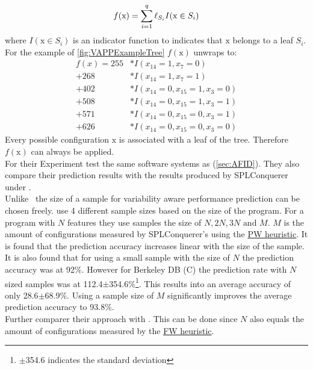 \begin{equation}\textsl{}
f(\mathrm{x})=\sum_{i=1}^{q} \ell_{S_i}I(\mathrm{x}\in S_i)
\end{equation}
where $I(\mathrm{x}\in S_i)$ is an indicator function to indicates that $\mathrm{x}$ belongs to a leaf $S_i$.\\
For the example of \autoref{fig:VAPPExampleTree} $f(\mathrm{x})$ unwraps to:
\begin{align*}
f(x) = 255&* I(x_{14}=1,x_7=0)\\[-0.1cm]
	 + 268&* I(x_{14}=1,x_7=1)\\[-0.1cm]
	 + 402&* I(x_{14}=0,x_{15}=1,x_3=0)\\[-0.1cm]
	 + 508&* I(x_{14}=0,x_{15}=1,x_3=1)\\[-0.1cm]
	 + 571&* I(x_{14}=0,x_{15}=0,x_3=1)\\[-0.1cm]
	 + 626&* I(x_{14}=0,x_{15}=0,x_3=0)
\end{align*}
Every possible configuration $\mathrm{x}$ is associated with a leaf of the tree. Therefore $f(\mathrm{x})$ can always be applied.\\
For their Experiment \citet{VariabilityAwarePerformancePredictionJianmeiSigmundApel} test the same software systems as \citet{AutomatedFeatureDetectionSiegmund2012} (\cref{sec:AFID}). They also compare their prediction results with the results produced by SPLConquerer under \AFID.\\
Unlike \AFID~the size of a sample for variability aware performance prediction can be chosen freely. \citet{VariabilityAwarePerformancePredictionJianmeiSigmundApel} use 4 different sample sizes based on the size of the program. For a program with $N$ features they use samples the size of $N,2N,3N \text{ and } M$. $M$ is the amount of configurations measured by SPLConquerer's using the \hyperref[lab:PW]{PW heuristic}.
It is found that the prediction accuracy increases linear with the size of the sample. It is also found that for using a small sample with the size of $N$ the prediction accuracy was at 92\%. However for Berkeley DB (C) the prediction rate with $N$ sized samples was at 112.4$\pm$354.6\%\footnote{$\pm$354.6 indicates the standard deviation}. This results into an average accuracy of only 28.6$\pm$68.9\%. Using a sample size of $M$ significantly improves the average prediction accuracy to 93.8\%.\\
Further \citet{VariabilityAwarePerformancePredictionJianmeiSigmundApel} comparer their approach with \AFID. This can be done since $N$ also equals the amount of configurations measured by the \hyperref[lab:FW]{FW heuristic}.\\
